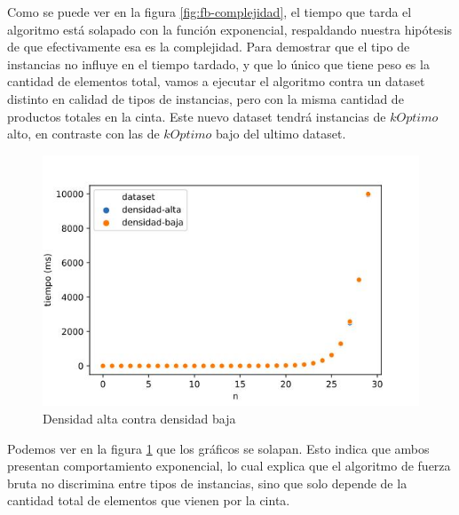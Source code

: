 \documentclass[10pt,a4paper]{article}
\begin{document}
Como se puede ver en la figura \ref{fig:fb-complejidad}, el tiempo que tarda el algoritmo está solapado con la función exponencial, respaldando nuestra hipótesis de que efectivamente esa es la complejidad.
\newpage
Para demostrar que el tipo de instancias no influye en el tiempo tardado, y que lo único que tiene peso es la cantidad de elementos total, vamos a ejecutar el algoritmo contra un dataset distinto en calidad de tipos de instancias, pero con la misma cantidad de productos totales en la cinta. Este nuevo dataset tendrá instancias de $kOptimo$ alto, en contraste con las de $kOptimo$ bajo del ultimo dataset.
\newline
\begin{figure}[h!]
	\centering
		\includegraphics[scale=0.35]{img/fb-densidades.jpg}
		\caption{Densidad alta contra densidad baja}
		\label{fig:fb-densidad}
\end{figure}
\newline
Podemos ver en la figura \ref{fig:fb-densidad} que los gráficos se solapan. Esto indica que ambos presentan comportamiento exponencial, lo cual explica que el algoritmo de fuerza bruta no discrimina entre tipos de instancias, sino que solo depende de la cantidad total de elementos que vienen por la cinta.
\newline
\end{document}
